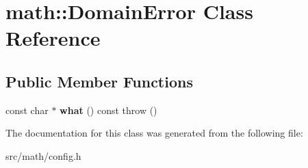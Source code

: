 \hypertarget{classmath_1_1DomainError}{
\section{math::DomainError Class Reference}
\label{classmath_1_1DomainError}
}
\subsection*{Public Member Functions}
\begin{DoxyCompactItemize}
\item 
\hypertarget{classmath_1_1DomainError_a164a06f38e2149e3bbd5051fd0287d71}{
const char $\ast$ {\bfseries what} () const   throw ()}
\label{classmath_1_1DomainError_a164a06f38e2149e3bbd5051fd0287d71}

\end{DoxyCompactItemize}


The documentation for this class was generated from the following file:\begin{DoxyCompactItemize}
\item 
src/math/config.h\end{DoxyCompactItemize}
